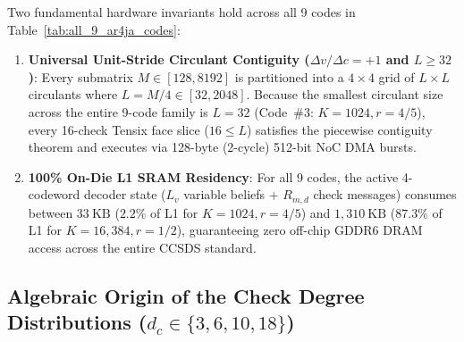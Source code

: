 \documentclass[10pt]{article}
\begin{document}
Two fundamental hardware invariants hold across all 9 codes in Table~\ref{tab:all_9_ar4ja_codes}:
\begin{enumerate}[leftmargin=1.8em, itemsep=2pt]
    \item \textbf{Universal Unit-Stride Circulant Contiguity ($\Delta v / \Delta c = +1$ and $L \ge 32$)}: Every submatrix $M \in [128, 8192]$ is partitioned into a $4 \times 4$ grid of $L \times L$ circulants where $L = M/4 \in [32, 2048]$. Because the smallest circulant size across the entire 9-code family is $L = 32$ (Code~\#3: $K=1024, r=4/5$), every 16-check Tensix face slice ($16 \le L$) satisfies the piecewise contiguity theorem and executes via 128-byte (2-cycle) 512-bit NoC DMA bursts.
    \item \textbf{100\% On-Die L1 SRAM Residency}: For all 9 codes, the active 4-codeword decoder state ($L_v$ variable beliefs + $R_{m,d}$ check messages) consumes between $33\ \mathrm{KB}$ ($2.2\%$ of L1 for $K=1024, r=4/5$) and $1,310\ \mathrm{KB}$ ($87.3\%$ of L1 for $K=16,384, r=1/2$), guaranteeing zero off-chip GDDR6 DRAM access across the entire CCSDS standard.
\end{enumerate}

\subsection{Algebraic Origin of the Check Degree Distributions ($d_c \in \{3, 6, 10, 18\}$)}
\end{document}
